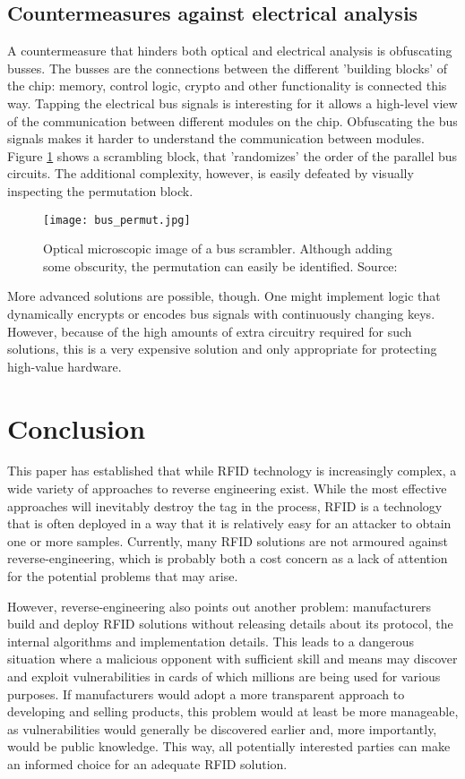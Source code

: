 \documentclass{llncs}
\begin{document}
\subsection{Countermeasures against electrical analysis}
A countermeasure that hinders both optical and electrical analysis is obfuscating busses. The busses are the connections between the different 'building blocks' of the chip: memory, control logic, crypto and other functionality is connected this way. Tapping the electrical bus signals is interesting for it allows a high-level view of the communication between different modules on the chip. Obfuscating the bus signals makes it harder to understand the communication between modules. Figure \ref{fig:buspermutation} shows a scrambling block, that 'randomizes' the order of the parallel bus circuits. The additional complexity, however, is easily defeated by visually inspecting the permutation block. 

\begin{figure}[ht!]
\centering
\texttt{[image: bus\_permut.jpg]}
\caption{Optical microscopic image of a bus scrambler. Although adding some obscurity, the permutation can easily be identified. Source:\cite{doc:kommerling}}
\label{fig:buspermutation}
\end{figure}

More advanced solutions are possible, though. One might implement logic that dynamically encrypts or encodes bus signals with continuously changing keys. However, because of the high amounts of extra circuitry required for such solutions, this is a very expensive solution and only appropriate for protecting high-value hardware. 


\section{Conclusion}
\label{sec:conclusion}
This paper has established that while RFID technology is increasingly complex, a wide variety of approaches to reverse engineering exist. While the most effective approaches will inevitably destroy the tag in the process, RFID is a technology that is often deployed in a way that it is relatively easy for an attacker to obtain one or more samples. Currently, many RFID solutions are not armoured against reverse-engineering, which is probably both a cost concern as a lack of attention for the potential problems that may arise.

However, reverse-engineering also points out another problem: manufacturers build and deploy RFID solutions without releasing details about its protocol, the internal algorithms and implementation details. This leads to a dangerous situation where a malicious opponent with sufficient skill and means may discover and exploit vulnerabilities in cards of which millions are being used for various purposes. If manufacturers would adopt a more transparent approach to developing and selling products, this problem would at least be more manageable, as vulnerabilities would generally be discovered earlier and, more importantly, would be public knowledge. This way, all potentially interested parties can make an informed choice for an adequate RFID solution. 
\end{document}
